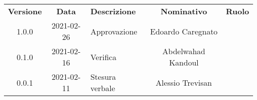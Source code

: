 {
    \renewcommand{\arraystretch}{1.5}
    \centering
    \begin{longtable}{ c c  C{4cm}  c  c }
        \rowcolor{\primaryColor}
        \textcolor{\secondaryColor}{
        \textbf{Versione}}     & \textcolor{\secondaryColor}{\textbf{Data}}       & \textcolor{\secondaryColor}
        {\textbf{Descrizione}} & \textcolor{\secondaryColor}{\textbf{Nominativo}} & \textcolor{\secondaryColor}{\textbf{Ruolo}}                          \\


        1.0.0                  & 2021-02-26                                       & Approvazione                                & Edoardo Caregnato & \responsabile{} \\
        0.1.0                  & 2021-02-16                                       & Verifica                                    & Abdelwahad Kandoul & \verificatore{} \\
        0.0.1                  & 2021-02-11                                       & Stesura verbale                         & Alessio Trevisan & \redattore{}    \\
    \end{longtable}
}